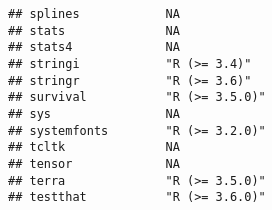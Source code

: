 \documentclass[
]{article}
\begin{document}
\begin{verbatim}
## splines            NA                                                                                                                                                                                                    
## stats              NA                                                                                                                                                                                                    
## stats4             NA                                                                                                                                                                                                    
## stringi            "R (>= 3.4)"                                                                                                                                                                                          
## stringr            "R (>= 3.6)"                                                                                                                                                                                          
## survival           "R (>= 3.5.0)"                                                                                                                                                                                        
## sys                NA                                                                                                                                                                                                    
## systemfonts        "R (>= 3.2.0)"                                                                                                                                                                                        
## tcltk              NA                                                                                                                                                                                                    
## tensor             NA                                                                                                                                                                                                    
## terra              "R (>= 3.5.0)"                                                                                                                                                                                        
## testthat           "R (>= 3.6.0)"                                                                                                                                                                                        

\end{verbatim}
\end{document}
